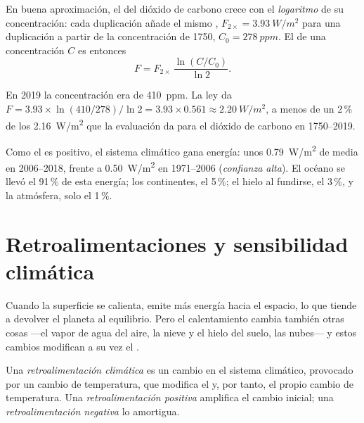 \begin{proposition}\label{prop:g12:climate-change:log}
En buena aproximación, el  del dióxido de carbono crece con el
\emph{logaritmo} de su concentración: cada duplicación añade el mismo ,
$F_{2\times} = \qty{3.93}{W/m^2}$ para una duplicación a partir de la concentración de
1750, $C_0 = \qty{278}{ppm}$. El  de una concentración $C$ es entonces
\[
  F = F_{2\times}\,\frac{\ln (C/C_0)}{\ln 2}.
\]
\end{proposition}

\begin{example}\label{ex:g12:climate-change:check}
En 2019 la concentración era de \qty{410}{ppm}. La ley da
$F = 3.93 \times \ln(410/278)/\ln 2 = 3.93 \times 0.561 \approx
\qty{2.20}{W/m^2}$, a menos de un 2\,\% de los \qty{2.16}{W/m^2} que la
evaluación da para el dióxido de carbono en 1750--2019.
\end{example}

\begin{proposition}\label{prop:g12:climate-change:heating}
Como el  es positivo, el sistema climático gana energía: unos
\qty{0.79}{W/m^2} de media en 2006--2018, frente a \qty{0.50}{W/m^2} en
1971--2006 (\emph{confianza alta}). El océano se llevó el 91\,\% de esta energía; los
continentes, el 5\,\%; el hielo al fundirse, el 3\,\%, y la atmósfera, solo el 1\,\%.
\end{proposition}

\section{Retroalimentaciones y sensibilidad climática}

Cuando la superficie se calienta, emite más energía hacia el espacio, lo que tiende a
devolver el planeta al equilibrio. Pero el calentamiento cambia también otras
cosas ---el vapor de agua del aire, la nieve y el hielo del suelo, las
nubes--- y estos cambios modifican a su vez el .

\begin{definition}\label{def:g12:climate-change:feedback}
Una \emph{retroalimentación climática} es un cambio en el sistema
climático, provocado por un cambio de temperatura, que modifica el 
y, por tanto, el propio cambio de temperatura. Una \emph{retroalimentación positiva} amplifica
el cambio inicial; una \emph{retroalimentación negativa} lo amortigua.
\end{definition}

